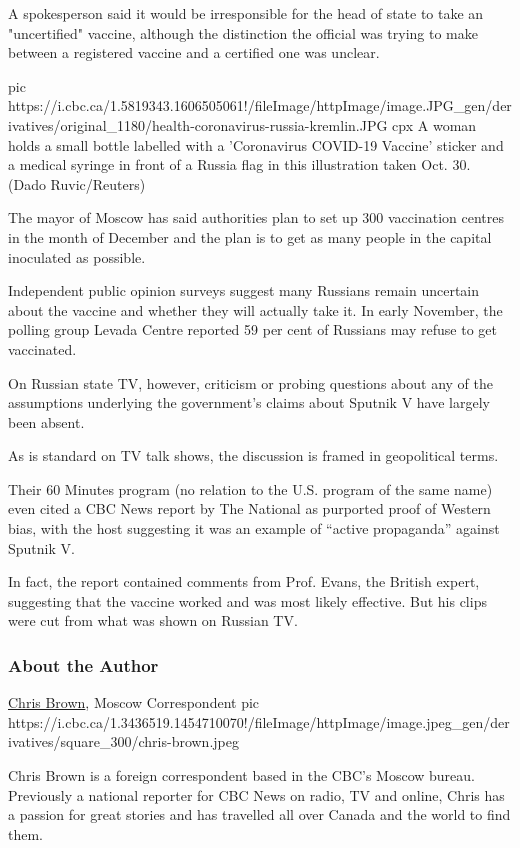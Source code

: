 A spokesperson said it would be irresponsible for the head of state to take an
"uncertified" vaccine, although the distinction the official was trying to make
between a registered vaccine and a certified one was unclear.     

\ifcmt
pic https://i.cbc.ca/1.5819343.1606505061!/fileImage/httpImage/image.JPG_gen/derivatives/original_1180/health-coronavirus-russia-kremlin.JPG
cpx A woman holds a small bottle labelled with a 'Coronavirus COVID-19 Vaccine' sticker and a medical syringe in front of a Russia flag in this illustration taken Oct. 30. (Dado Ruvic/Reuters)
\fi

The mayor of Moscow has said authorities plan to set up 300 vaccination centres
in the month of December and the plan is to get as many people in the capital
inoculated as possible.

Independent public opinion surveys suggest many Russians remain uncertain about
the vaccine and whether they will actually take it. In early November, the
polling group Levada Centre reported 59 per cent of Russians may refuse to get
vaccinated.

On Russian state TV, however, criticism or probing questions about any of the
assumptions underlying the government's claims about Sputnik V have largely
been absent.     

As is standard on TV talk shows, the discussion is framed in geopolitical
terms.

Their 60 Minutes program (no relation to the U.S. program of the same name)
even cited a CBC News report by The National as purported proof of Western
bias, with the host suggesting it was an example of \enquote{active propaganda} against
Sputnik V.   

In fact, the report contained comments from Prof. Evans, the British expert,
suggesting that the vaccine worked and was most likely effective. But his clips
were cut from what was shown on Russian TV.

\subsubsection{About the Author}

\href{https://www.cbc.ca/news/canada/british-columbia/chris-brown-1.3436494}{Chris Brown}, Moscow Correspondent
\ifcmt
pic https://i.cbc.ca/1.3436519.1454710070!/fileImage/httpImage/image.jpeg_gen/derivatives/square_300/chris-brown.jpeg
\fi

Chris Brown is a foreign correspondent based in the CBC’s Moscow bureau.
Previously a national reporter for CBC News on radio, TV and online, Chris has
a passion for great stories and has travelled all over Canada and the world to
find them.
